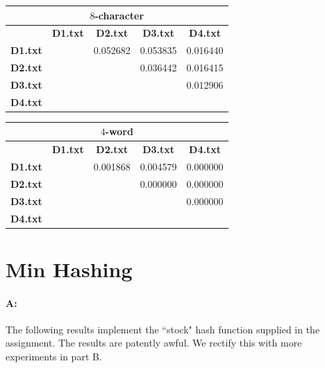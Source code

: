 \documentclass[11pt]{article}
\begin{document}
\begin{center}

\begin{tabular}{| c || c | c | c | c |}
\hline
\multicolumn{5}{|c|}{$8$-character} \\
\hline
& \textbf{D1.txt} & \textbf{D2.txt}  & \textbf{D3.txt}  & \textbf{D4.txt} \\
\hline
\hline
\textbf{D1.txt} &  & 0.052682 & 0.053835 & 0.016440 \\
\hline
\textbf{D2.txt} &  & & 0.036442 & 0.016415 \\
\hline
\textbf{D3.txt} &  &  &  & 0.012906 \\
\hline
\textbf{D4.txt} &  &  &  &  \\
\hline
\end{tabular}

\end{center}

\begin{center}

\begin{tabular}{| c || c | c | c | c |}
\hline
\multicolumn{5}{|c|}{$4$-word} \\
\hline
& \textbf{D1.txt} & \textbf{D2.txt}  & \textbf{D3.txt}  & \textbf{D4.txt} \\
\hline
\hline
\textbf{D1.txt} &  & 0.001868 & 0.004579 & 0.000000 \\
\hline
\textbf{D2.txt} &  & & 0.000000 & 0.000000 \\
\hline
\textbf{D3.txt} &  &  &  & 0.000000 \\
\hline
\textbf{D4.txt} &  &  &  &  \\
\hline
\end{tabular}

\end{center}














\section{Min Hashing}

\paragraph{A:} The following results implement the ``stock" hash function supplied in the assignment. The results are patently awful. We rectify this with more experiments in part B.
\end{document}
